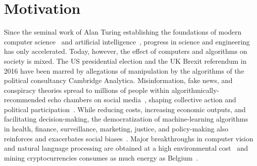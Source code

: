 \section{Motivation}
\label{in:sec:motivation}

Since the seminal work of Alan Turing establishing the foundations of modern computer science~\citep{turing1937computable} and artificial intelligence~\citep{turing2009computing}, progress in science and engineering has only accelerated.
Today, however, the effect of computers and algorithms on society is mixed.
The US presidential election and the UK Brexit referendum in 2016 have been marred by allegations of manipulation by the algorithms of the political consultancy Cambridge Analytica.
Misinformation, fake news, and conspiracy theories spread to millions of people within algorithmically-recommended echo chambers on social media~\citep{kumar2016disinformation,garimella2018political,brugnoli2019recursive,ribeiro2020auditing,cinelli2021echo}, shaping collective action and political participation~\citep{margetts2015political}.
While reducing costs, increasing economic outputs, and facilitating decision-making, the democratization of machine-learning algorithms in health, finance, surveillance, marketing, justice, and policy-making also reinforces and exacerbates social biases~\citep{baeza2016data,hajian2016algorithmic,stoica2018algorithmic,rodolfa2020case}.
Major breakthroughs in computer vision and natural language processing are obtained at a high environmental cost~\citep{strubell2019energy} and mining cryptocurrencies consumes as much energy as Belgium~\citep{stoll2019carbon,gallersdorfer2020energy,de2020bitcoin}.

